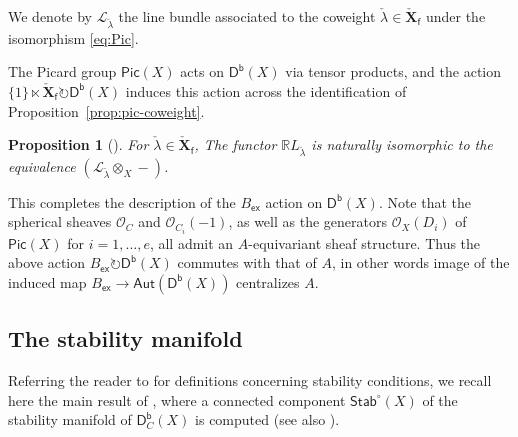 \documentclass[reqno,a4paper]{amsart}
\newcommand{\personal}[1]{\textcolor[rgb]{0,0,1}{(Personal: #1)}}
\newcommand{\parth}[1]{\textcolor[rgb]{0,1,0}{(Parth: #1)}}
\newcommand{\todo}[1]{\textcolor{red}{(Todo: #1)}}
\newcommand\ast{\personal}[1]{\ignorespaces}
\newcommand\ast{\parth}[1]{\ignorespaces}
\newcommand\ast{\todo}[1]{\ignorespaces}
\newcommand{\calL}{\mathcal{L}}
\newcommand{\R}{\mathbb{R}}
\newcommand{\scrO}{\mathscr{O}}
\newcommand{\sff}{\mathsf{f}}
\newcommand{\bfX}{\mathbf{X}}
\newcommand{\Stab}{\mathsf{Stab}}
\newcommand{\catDb}{\mathsf{D}^\mathsf{b}}
\newcommand{\catDbC}{\mathsf{D}^\mathsf{b}_C}
\newcommand{\Llambda}{{\check{\lambda}}}
\newcommand{\weightlattice}{\bfX}
\newcommand{\coweightlattice}{\check{\weightlattice}}
\newcommand{\coweightlatticefin}{\coweightlattice_\sff}
\newcommand{\sfex}{\mathsf{ex}}
\newcommand{\rsv}{X}
\newcommand{\ssv}{X_\emptyset}
\newcommand{\psv}{X_J}
\newcommand{\Jcomp}{{J^\mathsf{c}}}
\newcommand{\Aut}{\mathsf{Aut}}
\newcommand{\Pic}{\mathsf{Pic}}
\theoremstyle{basic-theorem}
\newtheorem{proposition}[theorem]{Proposition}
\numberwithin{equation}{section}
\begin{document}
\begin{notation}
 	We denote by $\calL_{\Llambda}$ the line bundle associated to the coweight $\Llambda\in\coweightlatticefin$ under the isomorphism \eqref{eq:Pic}.
\end{notation}

The Picard group $\Pic(\rsv)$ acts on $\catDb(\rsv)$ via tensor products, and the action $\{1\}\ltimes \coweightlatticefin\circlearrowright\catDb(\rsv)$ induces this action across the identification of Proposition~\ref{prop:pic-coweight}.

\begin{proposition}[{\cite[Proposition~\ref*{COHA-Yangian-prop:braid}]{DPSSV-3}}]\label{prop:braid-tilting-intertwiner}
	For $\Llambda\in \coweightlatticefin$, The functor $\R L_\Llambda$ is naturally isomorphic to the equivalence $(\calL_\Llambda\otimes_\rsv -)$.
\end{proposition}

This completes the description of the $B_\sfex$ action on $\catDb(\rsv)$. Note that the spherical sheaves $\scrO_C$ and $\scrO_{C_i}(-1)$, as well as the generators $\scrO_\rsv(D_i)$ of $\Pic(\rsv)$ for $i=1, \ldots, e$, all admit an $A$-equivariant sheaf structure. Thus the above action $B_\sfex\circlearrowright\catDb(\rsv)$ commutes with that of $A$, in other words image of the induced map $B_\sfex\to \Aut(\catDb(\rsv))$ centralizes $A$.


\subsection{The stability manifold}\label{subsec:stability-manifold}

Referring the reader to \cite{B07} for definitions concerning stability conditions, we recall here the main result of \cite{Stab_Kleinian}, where a connected component $\Stab^\circ(\rsv)$ of the stability manifold of $\catDbC(\rsv)$ is computed (see also \cite{Thomas_Stab}).
\end{document}
